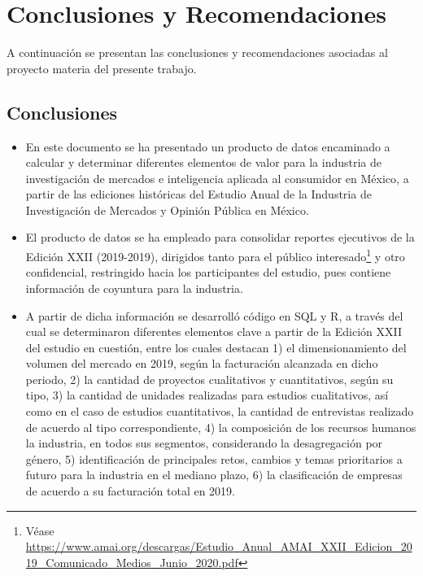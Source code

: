 \chapter*{Conclusiones y Recomendaciones}

A continuación se presentan las conclusiones y recomendaciones asociadas al proyecto materia del presente trabajo.


\section*{Conclusiones}

\begin{itemize}
    \item En este documento se ha presentado un producto de datos encaminado a calcular y determinar diferentes elementos de valor para la industria  de investigación de mercados e inteligencia aplicada al consumidor en México, a partir de las ediciones históricas del Estudio Anual de la Industria de Investigación de Mercados y Opinión Pública en México.
    \item El producto de datos se ha empleado para consolidar reportes ejecutivos de la Edición XXII (2019-2019), dirigidos tanto para el público interesado\footnote{Véase \url{https://www.amai.org/descargas/Estudio_Anual_AMAI_XXII_Edicion_2019_Comunicado_Medios_Junio_2020.pdf}} y otro confidencial, restringido hacia los participantes del estudio, pues contiene información de coyuntura para la industria.
    \item A partir de dicha información se desarrolló código en SQL y R, a través del cual se determinaron diferentes elementos clave a partir de la Edición XXII del estudio en cuestión, entre los cuales destacan 1) el dimensionamiento del volumen del mercado en 2019, según la facturación alcanzada en dicho periodo, 2) la cantidad de proyectos cualitativos y cuantitativos, según su tipo, 3) la cantidad de unidades realizadas para estudios cualitativos, así como en el caso de estudios cuantitativos, la cantidad de entrevistas realizado de acuerdo al tipo correspondiente, 4) la composición de los recursos humanos la industria, en todos sus segmentos, considerando la desagregación por género, 5) identificación de principales retos, cambios y temas prioritarios a futuro para la industria en el mediano plazo, 6) la clasificación de empresas de acuerdo a su facturación total en 2019. 
    

\end{itemize}

